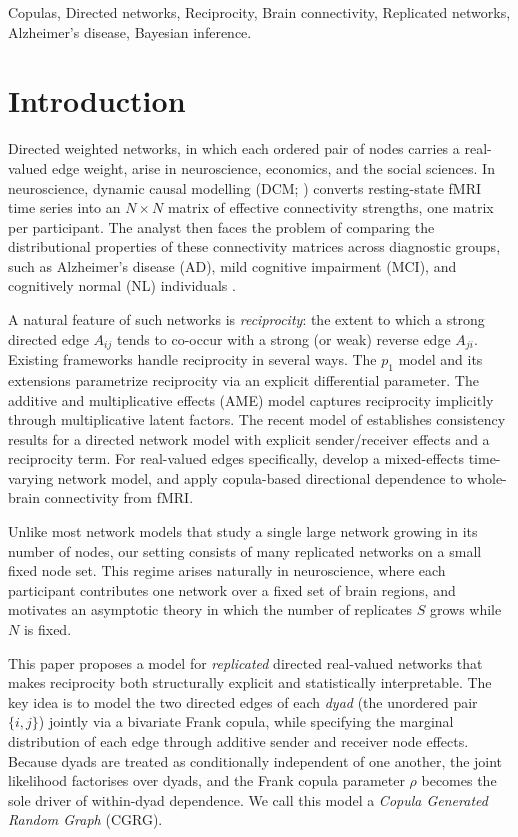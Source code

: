 \documentclass[12pt]{article}
\begin{document}
\smallskip {}
Copulas,
Directed networks,
Reciprocity,
Brain connectivity,
Replicated networks,
Alzheimer's disease,
Bayesian inference.

\newpage



\section{Introduction}

Directed weighted networks, in which each ordered pair of nodes carries a
real-valued edge weight, arise in neuroscience, economics, and the social
sciences.  In neuroscience, dynamic causal modelling (DCM; \citealp{friston2003,
friston2014}) converts resting-state fMRI time series into an $N \times N$
matrix of effective connectivity strengths, one matrix per participant.  The
analyst then faces the problem of comparing the distributional properties of
these connectivity matrices across diagnostic groups, such as Alzheimer's disease (AD),
mild cognitive impairment (MCI), and cognitively normal (NL) individuals
\citep{nie2020, huang2022, monash2024}.

A natural feature of such networks is \emph{reciprocity}: the extent to which
a strong directed edge $A_{ij}$ tends to co-occur with a strong (or weak)
reverse edge $A_{ji}$.  Existing frameworks handle reciprocity in several
ways.  The $p_1$ model \citep{holland81} and its extensions parametrize
reciprocity via an explicit differential parameter.  The additive and
multiplicative effects (AME) model \citep{hoff2005} captures reciprocity
implicitly through multiplicative latent factors.  The recent model of
\citet{fengleng2025} establishes consistency results for a directed network
model with explicit sender/receiver effects and a reciprocity term.  For
real-valued edges specifically, \citet{zhang2020} develop a mixed-effects
time-varying network model, and \citet{leekimbrain2019} apply copula-based
directional dependence to whole-brain connectivity from fMRI.

Unlike most network models that study a single large network growing in its
number of nodes, our setting consists of many replicated networks on a small
fixed node set.  This regime arises naturally in neuroscience, where each
participant contributes one network over a fixed set of brain regions, and
motivates an asymptotic theory in which the number of replicates $S$ grows
while $N$ is fixed.

This paper proposes a model for \emph{replicated} directed real-valued
networks that makes reciprocity both structurally explicit and statistically
interpretable.  The key idea is to model the two directed edges of each
\emph{dyad} (the unordered pair $\{i,j\}$) jointly via a bivariate Frank
copula, while specifying the marginal distribution of each edge through
additive sender and receiver node effects.  Because dyads are treated as
conditionally independent of one another, the joint likelihood factorises
over dyads, and the Frank copula parameter $\rho$ becomes the sole driver of
within-dyad dependence.  We call this model a \emph{Copula Generated Random
Graph} (CGRG).
\end{document}
